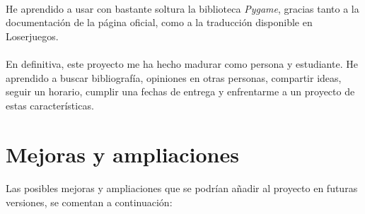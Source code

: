 \documentclass[a4paper,11pt]{article} %
\begin{document}
\paragraph{}
He aprendido a usar con bastante soltura la biblioteca \emph{Pygame}, gracias tanto a la documentación de la página oficial, como
a la traducción disponible en Loserjuegos.

\paragraph{}
En definitiva, este proyecto me ha hecho madurar como persona y estudiante. He aprendido a buscar bibliografía, opiniones en otras
personas, compartir ideas, seguir un horario, cumplir una fechas de entrega y enfrentarme a un proyecto de estas características.


\section{Mejoras y ampliaciones}

\paragraph{}
Las posibles mejoras y ampliaciones que se podrían añadir al proyecto en futuras versiones, se comentan a continuación:
\end{document}
